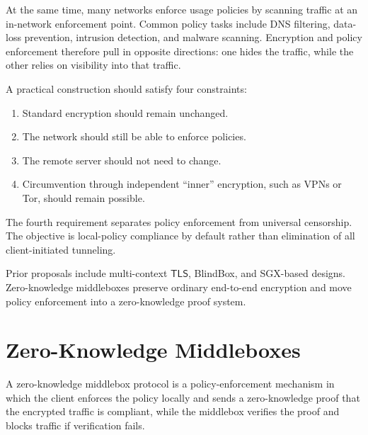 \documentclass[11pt]{article}
\newcommand{\TLS}{\ensuremath{\mathsf{TLS}}}
\begin{document}
At the same time, many networks enforce usage policies by scanning traffic at
an in-network enforcement point.  Common policy tasks include DNS filtering,
data-loss prevention, intrusion detection, and malware scanning.  Encryption
and policy enforcement therefore pull in opposite directions: one hides the
traffic, while the other relies on visibility into that traffic.

\begin{highlight}[title={Design Requirements}]
A practical construction should satisfy four constraints:
\begin{enumerate}
  \item Standard encryption should remain unchanged.
  \item The network should still be able to enforce policies.
  \item The remote server should not need to change.
  \item Circumvention through independent ``inner'' encryption, such as VPNs
        or Tor, should remain possible.
\end{enumerate}
\end{highlight}

The fourth requirement separates policy enforcement from universal censorship.
The objective is local-policy compliance by default rather than elimination of
all client-initiated tunneling.

\begin{remark}
Prior proposals include multi-context \TLS, BlindBox, and SGX-based designs.
Zero-knowledge middleboxes preserve ordinary end-to-end encryption and move
policy enforcement into a zero-knowledge proof system.
\end{remark}

\section{Zero-Knowledge Middleboxes}

\begin{definition}
A zero-knowledge middlebox protocol is a policy-enforcement mechanism in which
the client enforces the policy locally and sends a zero-knowledge proof that
the encrypted traffic is compliant, while the middlebox verifies the proof and
blocks traffic if verification fails.
\end{definition}
\end{document}
